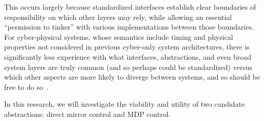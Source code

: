 This occurs largely because standardized interfaces establish clear
boundaries of
responsibility on which other layers may rely, while allowing an essential
``permission to tinker'' with various implementations between those
boundaries. For cyber-physical systems, whose semantics include timing
and physical properties not considered in previous cyber-only system
architectures, there is significantly less experience with what interfaces,
abstractions, and even broad system layers are truly common (and so perhaps
could be standardized) versus which other aspects are more likely to
diverge between systems, and so should be free to do so~\cite{cag18}.

In this research, we will investigate the viability and utility of
two candidate abstractions: direct mirror control and MDP control.

